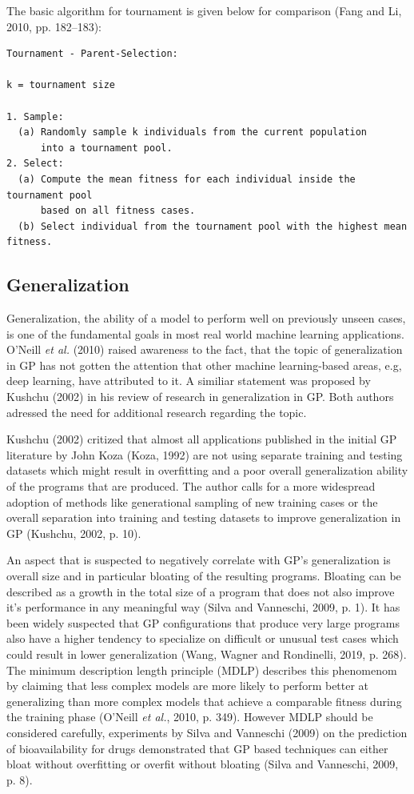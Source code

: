 \documentclass[
  12pt,
]{article}
\begin{document}
The basic algorithm for tournament is given below for comparison (Fang
and Li, 2010, pp. 182--183):

\begin{verbatim}
Tournament - Parent-Selection:

k = tournament size

1. Sample:
  (a) Randomly sample k individuals from the current population
      into a tournament pool.
2. Select:
  (a) Compute the mean fitness for each individual inside the tournament pool
      based on all fitness cases.
  (b) Select individual from the tournament pool with the highest mean fitness.
\end{verbatim}

\hypertarget{generalization}{%
\subsection{Generalization}\label{generalization}}

Generalization, the ability of a model to perform well on previously
unseen cases, is one of the fundamental goals in most real world machine
learning applications. O'Neill \emph{et al.} (2010) raised awareness to
the fact, that the topic of generalization in GP has not gotten the
attention that other machine learning-based areas, e.g, deep learning,
have attributed to it. A similiar statement was proposed by Kushchu
(2002) in his review of research in generalization in GP. Both authors
adressed the need for additional research regarding the topic.

Kushchu (2002) critized that almost all applications published in the
initial GP literature by John Koza (Koza, 1992) are not using separate
training and testing datasets which might result in overfitting and a
poor overall generalization ability of the programs that are produced.
The author calls for a more widespread adoption of methods like
generational sampling of new training cases or the overall separation
into training and testing datasets to improve generalization in GP
(Kushchu, 2002, p. 10).

An aspect that is suspected to negatively correlate with GP's
generalization is overall size and in particular bloating of the
resulting programs. Bloating can be described as a growth in the total
size of a program that does not also improve it's performance in any
meaningful way (Silva and Vanneschi, 2009, p. 1). It has been widely
suspected that GP configurations that produce very large programs also
have a higher tendency to specialize on difficult or unusual test cases
which could result in lower generalization (Wang, Wagner and Rondinelli,
2019, p. 268). The minimum description length principle (MDLP) describes
this phenomenom by claiming that less complex models are more likely to
perform better at generalizing than more complex models that achieve a
comparable fitness during the training phase (O'Neill \emph{et al.},
2010, p. 349). However MDLP should be considered carefully, experiments
by Silva and Vanneschi (2009) on the prediction of bioavailability for
drugs demonstrated that GP based techniques can either bloat without
overfitting or overfit without bloating (Silva and Vanneschi, 2009, p.
8).
\end{document}

